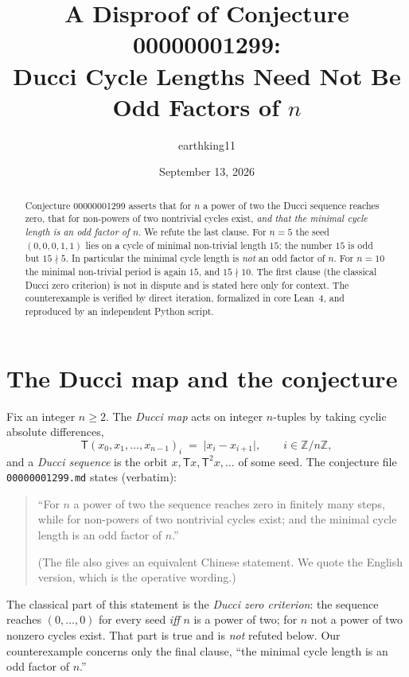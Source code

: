 \documentclass[11pt]{article}
\title{A Disproof of Conjecture 00000001299:\\
Ducci Cycle Lengths Need Not Be Odd Factors of $n$}
\author{earthking11}
\date{September 13, 2026}
\theoremstyle{definition}
\newcommand{\T}{\mathsf{T}}
\newcommand{\Z}{\mathbb{Z}}
\begin{document}
\maketitle

\begin{abstract}
Conjecture 00000001299 asserts that for $n$ a power of two the Ducci sequence
reaches zero, that for non-powers of two nontrivial cycles exist, \emph{and that
the minimal cycle length is an odd factor of $n$}. We refute the last clause.
For $n = 5$ the seed $(0,0,0,1,1)$ lies on a cycle of minimal non-trivial length
$15$; the number $15$ is odd but $15 \nmid 5$. In particular the minimal cycle
length is \emph{not} an odd factor of $n$. For $n = 10$ the minimal non-trivial
period is again $15$, and $15 \nmid 10$. The first clause (the classical Ducci
zero criterion) is not in dispute and is stated here only for context. The
counterexample is verified by direct iteration, formalized in core Lean~4, and
reproduced by an independent Python script.
\end{abstract}

\section{The Ducci map and the conjecture}

Fix an integer $n \ge 2$. The \emph{Ducci map} acts on integer $n$-tuples by
taking cyclic absolute differences,
\begin{equation}\label{eq:ducci}
  \T(x_0, x_1, \dots, x_{n-1})_i
  \;=\; \lvert x_i - x_{i+1} \rvert,
  \qquad i \in \Z/n\Z ,
\end{equation}
and a \emph{Ducci sequence} is the orbit $x, \T x, \T^2 x, \dots$ of some seed.
The conjecture file \texttt{00000001299.md} states (verbatim):

\begin{quote}
``For $n$ a power of two the sequence reaches zero in finitely many steps, while
for non-powers of two nontrivial cycles exist; and the minimal cycle length is
an odd factor of $n$.''

\noindent (The file also gives an equivalent Chinese statement. We quote the
English version, which is the operative wording.)
\end{quote}

The classical part of this statement is the \emph{Ducci zero criterion}: the
sequence reaches $(0,\dots,0)$ for every seed \emph{iff} $n$ is a power of two;
for $n$ not a power of two nonzero cycles exist. That part is true and is
\emph{not} refuted below. Our counterexample concerns only the final clause,
``the minimal cycle length is an odd factor of $n$.''
\end{document}
